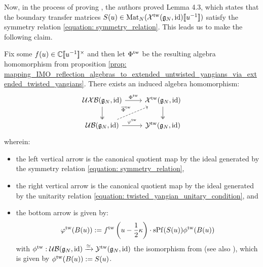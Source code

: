             Now, in the process of proving \cite[Theorem 4.1]{guay_regelskis_twisted_yangians_for_symmetric_pairs_of_types_BCD}, the authors proved Lemma 4.3, which states that the boundary transfer matrices $S(u) \in \mathrm{Mat}_N( \mathcal{X}^{\mathrm{tw}}(\mathfrak{g}_N, \mathrm{id})[\![u^{-1}]\!] )$ satisfy the symmetry relation \eqref{equation: symmetry_relation}. This leads us to make the following claim.
            \begin{theorem} \label{theorem: IMO_reflection_algebras_vs_BCD0_twisted_yangians}
                Fix some $f(u) \in \bbC[\![u^{-1}]\!]^{\x}$ and then let $\Phi^{\mathrm{tw}}$ be the resulting algebra homomorphism from proposition \ref{prop: mapping_IMO_reflection_algebras_to_extended_untwisted_yangians_via_extended_twisted_yangians}. There exists an induced algebra homomorphism:
                    $$
                        \begin{tikzcd}
                    	{\UXB(\g_N, \id)} & {\calX^{\tw}(\g_N, \id)} \\
                    	{\UB(\g_N, \id)} & {\calY^{\tw}(\g_N, \id)}
                    	\arrow["{{\Phi^{\tw}}}", from=1-1, to=1-2]
                    	\arrow[two heads, from=1-1, to=2-1]
                    	\arrow[two heads, from=1-2, to=2-2]
                    	\arrow["{{\overline{\Phi}^{\tw}}}", dashed, from=2-1, to=1-2]
                    	\arrow["\varphi^{\tw}", from=2-1, to=2-2]
                        \end{tikzcd}
                    $$
                wherein:
                \begin{itemize}
                    \item the left vertical arrow is the canonical quotient map by the ideal generated by the symmetry relation \eqref{equation: symmetry_relation},
                    \item the right vertical arrow is the canonical quotient map by the ideal generated by the unitarity relation \eqref{equation: twisted_yangian_unitary_condition}, and
                    \item the bottom arrow is given by:
                        $$\varphi^{\mathrm{tw}}( B(u) ) := f^{\mathrm{tw}}\left( u - \frac12 \kappa \right) \cdot \operatorname{sPf}( S(u) ) \phi^{\mathrm{tw}}( B(u) )$$
                    with $\phi^{\mathrm{tw}}: \mathcal{UB}(\mathfrak{g}_N, \mathrm{id}) \xrightarrow[]{\simeq} \mathcal{Y}^{\mathrm{tw}}(\mathfrak{g}_N, \mathrm{id})$ the isomorphism from \cite[Theorem 4.1]{guay_regelskis_twisted_yangians_for_symmetric_pairs_of_types_BCD} (see also \cite[Equation 4.32]{guay_regelskis_twisted_yangians_for_symmetric_pairs_of_types_BCD}), which is given by $\phi^{\mathrm{tw}}( B(u) ) := S(u)$. 
                \end{itemize}
            \end{theorem}
